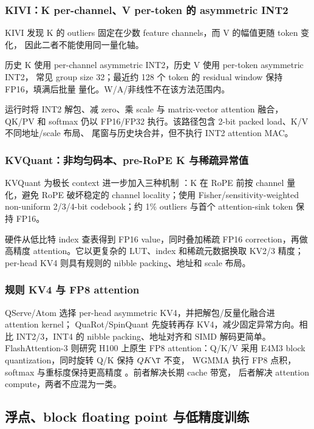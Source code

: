 \subsubsection{KIVI：K per-channel、V per-token 的 asymmetric INT2}

KIVI 发现 K 的 outliers 固定在少数 feature channels，而 V 的幅值更随 token 变化，
因此二者不能使用同一量化轴。

历史 K 使用 per-channel asymmetric INT2，历史 V 使用 per-token asymmetric INT2，
常见 group size 32；最近约 128 个 token 的 residual window 保持 FP16，填满后批量
量化。W/A/非线性不在该方法范围内。

运行时将 INT2 解包、减 zero、乘 scale 与 matrix-vector attention 融合，QK/PV 和
softmax 仍以 FP16/FP32 执行。该路径包含 2-bit packed load、K/V 不同地址/scale 布局、
尾窗与历史块合并，但不执行 INT2 attention MAC。

\subsubsection{KVQuant：非均匀码本、pre-RoPE K 与稀疏异常值}

KVQuant 为极长 context 进一步加入三种机制
：K 在 RoPE 前按 channel 量化，避免
RoPE 破坏稳定的 channel locality；使用 Fisher/sensitivity-weighted non-uniform
2/3/4-bit codebook；约 1\% outliers 与首个 attention-sink token 保持 FP16。

硬件从低比特 index 查表得到 FP16 value，同时叠加稀疏 FP16 correction，再做高精度
attention。它以更复杂的 LUT、index 和稀疏元数据换取 KV2/3 精度；per-head KV4
则具有规则的 nibble packing、地址和 scale 布局。

\subsubsection{规则 KV4 与 FP8 attention}

QServe/Atom 选择 per-head asymmetric KV4，并把解包/反量化融合进 attention kernel；
QuaRot/SpinQuant 先旋转再存 KV4，减少固定异常方向。相比 INT2/3，INT4 的 nibble
packing、地址对齐和 SIMD 解码更简单。FlashAttention-3 则研究 H100 上原生 FP8
attention：Q/K/V 采用 E4M3 block quantization，同时旋转 Q/K 保持 $QK\T$ 不变，
WGMMA 执行 FP8 点积，softmax 与重标度保持更高精度
。前者解决长期 cache 带宽，
后者解决 attention compute，两者不应混为一类。

\subsection{浮点、block floating point 与低精度训练}

